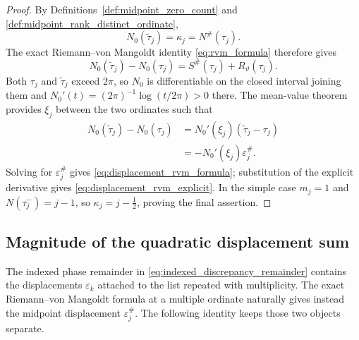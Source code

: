\documentclass[11pt]{amsart}
\numberwithin{equation}{section}
\theoremstyle{plain}
\theoremstyle{definition}
\theoremstyle{remark}
\newcommand{\1}{\mathbf{1}}
\begin{document}
\begin{proof}
By Definitions~\ref{def:midpoint_zero_count} and
\ref{def:midpoint_rank_distinct_ordinate},
\begin{equation}
N_0(\widetilde\tau_j)
=
\kappa_j
=
N^{\#}(\tau_j).
\label{eq:displacement_count_equalities}
\end{equation}
The exact Riemann--von Mangoldt identity
\eqref{eq:rvm_formula} therefore gives
\begin{equation}
N_0(\widetilde\tau_j)-N_0(\tau_j)
=
S^{\#}(\tau_j)+R_\vartheta(\tau_j).
\label{eq:displacement_count_difference}
\end{equation}
Both \(\tau_j\) and \(\widetilde\tau_j\) exceed \(2\pi\), so \(N_0\) is
differentiable on the closed interval joining them and
\(N_0'(t)=(2\pi)^{-1}\log(t/2\pi)>0\) there.  The mean-value theorem
provides \(\xi_j\) between the two ordinates such that
\begin{align}
N_0(\widetilde\tau_j)-N_0(\tau_j)
&=
N_0'(\xi_j)(\widetilde\tau_j-\tau_j)
\label{eq:displacement_mvt_first}
\\
&=
-N_0'(\xi_j)\varepsilon_j^{\#}.
\label{eq:displacement_mvt}
\end{align}
Solving for \(\varepsilon_j^{\#}\) gives
\eqref{eq:displacement_rvm_formula}; substitution of the explicit
derivative gives \eqref{eq:displacement_rvm_explicit}.  In the simple
case \(m_j=1\) and \(N(\tau_j^-)=j-1\), so
\(\kappa_j=j-\tfrac12\), proving the final assertion.
\end{proof}


\subsection{Magnitude of the quadratic displacement sum}
\label{subsec:rvm_displacement_square_size}

The indexed phase remainder in \eqref{eq:indexed_discrepancy_remainder}
contains the displacements \(\varepsilon_k\) attached to the list repeated
with multiplicity.  The exact Riemann--von Mangoldt formula at a multiple
ordinate naturally gives instead the midpoint displacement
\(\varepsilon_j^{\#}\).  The following identity keeps those two objects
separate.
\end{document}
